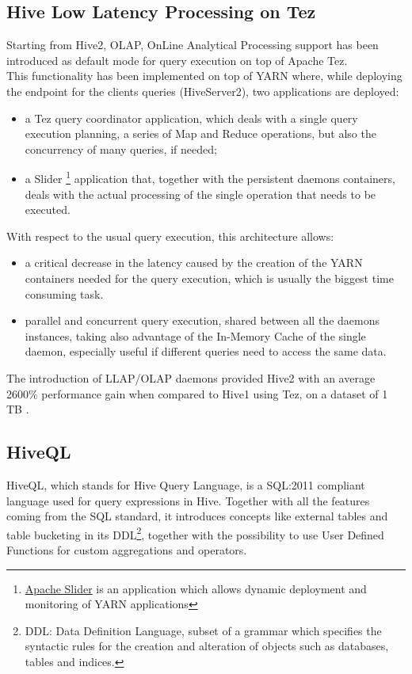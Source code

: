 \subsection{Hive Low Latency Processing on Tez}

Starting from Hive2, OLAP, OnLine Analytical Processing support has been introduced as default mode for query execution on top of Apache Tez.\\  
This functionality has been implemented on top of YARN where, while deploying the endpoint for the clients queries (HiveServer2), two applications are deployed: 

\begin{itemize}
    \item a Tez query coordinator application, which deals with a single query execution planning, a series of Map and Reduce operations, but also the concurrency of many queries, if needed;
    \item a Slider \footnote{\href{https://slider.incubator.apache.org/}{Apache Slider} is an application which allows dynamic deployment and monitoring of YARN applications} application that, together with the persistent daemons containers, deals with the actual processing of the single operation that needs to be executed.
\end{itemize}

With respect to the usual query execution, this architecture allows:

\begin{itemize} 
	\item a critical decrease in the latency caused by the creation of the YARN containers needed for the query execution, which is usually the biggest time consuming task.
	\item parallel and concurrent query execution, shared between all the daemons instances, taking also advantage of the In-Memory Cache of the single daemon, especially useful if different queries need to access the same data.
\end{itemize}

The introduction of LLAP/OLAP daemons provided Hive2 with an average 2600\% performance gain when compared to Hive1 using Tez, on a dataset of 1 TB \cite{hive2_on_tez}.

\subsection{HiveQL}

HiveQL, which stands for Hive Query Language, is a SQL:2011 compliant language used for query expressions in Hive. Together with all the features coming from the SQL standard, it introduces concepts like external tables and table bucketing in its DDL\footnote{DDL: Data Definition Language, subset of a grammar which specifies the syntactic rules for the creation and alteration of objects such as databases, tables and indices.}, together with the possibility to use User Defined Functions for custom aggregations and operators.

